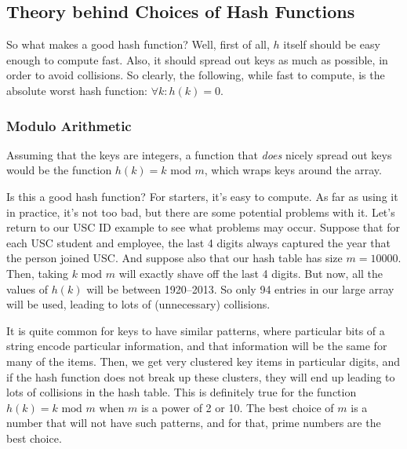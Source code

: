 \subsection{Theory behind Choices of Hash Functions}
So what makes a good hash function? 
Well, first of all, $h$ itself should be easy enough to compute fast.
Also, it should spread out keys as much as possible, in order to avoid
collisions. 
So clearly, the following, while fast to compute,
is the absolute worst hash function: $\forall k: h(k) = 0$.

\subsubsection{Modulo Arithmetic}
Assuming that the keys are integers, a function that \emph{does}
nicely spread out keys would be the function $h(k) = k \text{ mod } m$, 
which wraps keys around the array. 

Is this a good hash function? For starters, it's easy to compute.
As far as using it in practice, it's not too bad, but there are some
potential problems with it. Let's return to our USC ID example to see
what problems may occur. Suppose that for each USC student and employee, the
last 4 digits always captured the year that the person joined USC.
And suppose also that our hash table has size $m=10000$. 
Then, taking $k \text{ mod } m$ will exactly shave off the last 4
digits. But now, all the values of $h(k)$ will be between 1920--2013.
So only 94 entries in our large array will be used, leading to lots of
(unnecessary) collisions. 

It is quite common for keys to have similar patterns, where particular
bits of a string encode particular information, and that information
will be the same for many of the items. Then, we get very clustered
key items in particular digits, and if the hash function does not
break up these clusters, they will end up leading to lots of
collisions in the hash table. This is definitely true for the function
$h(k) = k \text{ mod } m$ when $m$ is a power of 2 or 10.
The best choice of $m$ is a number that will not have such patterns,
and for that, prime numbers are the best choice.

